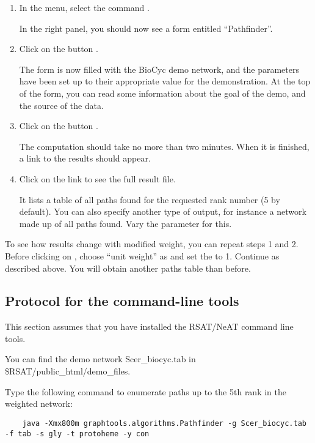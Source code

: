 \begin{enumerate}

\item In the \neat  menu, select the command .

  In the right panel, you should now see a form entitled
  ``Pathfinder''.

\item Click on the button .

  The form is now filled with the BioCyc demo network, and the parameters have been
  set up to their appropriate value for the demonstration. At the top
  of the form, you can read some information about the goal of the
  demo, and the source of the data.

\item Click on the button .

  The computation should take no more than two minutes. When it is finished, a link to the results should appear.

\item Click on the link to see the full result file.

  It lists a table of all paths found for the requested rank number (5 by default). You can also specify another type of output, for instance a network made up of all paths found. Vary the parameter  for this.

\end{enumerate}

To see how results change with modified weight, you can repeat steps 1 and 2. Before clicking on , choose ``unit weight'' as  and set the  to 1. Continue as described above. You will obtain another paths table than before.

\subsection{Protocol for the command-line tools}

This section assumes that you have installed the RSAT/NeAT command line tools.

You can find the demo network Scer\_biocyc.tab in \$RSAT/public\_html/demo\_files.

Type the following command to enumerate paths up to the 5th rank in the weighted network:
	{\color{Blue} \begin{footnotesize}
		\begin{verbatim}
	java -Xmx800m graphtools.algorithms.Pathfinder -g Scer_biocyc.tab -f tab -s gly -t protoheme -y con
	\end{verbatim} \end{footnotesize}
	}

